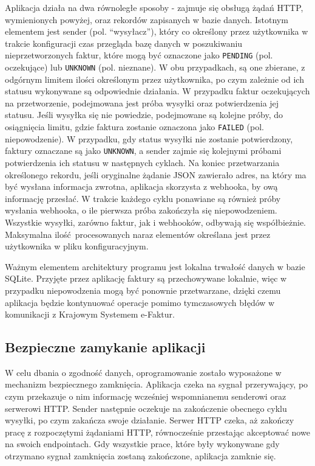 Aplikacja działa na dwa równoległe sposoby - zajmuje się obsługą żądań HTTP, wymienionych powyżej, oraz rekordów zapisanych w bazie danych. Istotnym elementem jest sender (pol. \enquote{wysyłacz}), który co określony przez użytkownika w trakcie konfiguracji czas przegląda bazę danych w poszukiwaniu nieprzetworzonych faktur, które mogą być oznaczone jako \texttt{PENDING} (pol. oczekujące) lub \texttt{UNKNOWN} (pol. nieznane). W obu przypadkach, są one zbierane, z odgórnym limitem ilości określonym przez użytkownika, po czym zależnie od ich statusu wykonywane są odpowiednie działania. W przypadku faktur oczekujących na przetworzenie, podejmowana jest próba wysyłki oraz potwierdzenia jej statusu. Jeśli wysyłka się nie powiedzie, podejmowane są kolejne próby, do osiągnięcia limitu, gdzie faktura zostanie oznaczona jako \texttt{FAILED} (pol. niepowodzenie). W przypadku, gdy status wysyłki nie zostanie potwierdzony, faktury oznaczane są jako \texttt{UNKNOWN}, a sender zajmie się kolejnymi próbami potwierdzenia ich statusu w następnych cyklach. Na koniec przetwarzania określonego rekordu, jeśli oryginalne żądanie JSON zawierało adres, na który ma być wysłana informacja zwrotna, aplikacja skorzysta z webhooka, by ową informację przesłać. W trakcie każdego cyklu ponawiane są również próby wysłania webhooka, o ile pierwsza próba zakończyła się niepowodzeniem. Wszystkie wysyłki, zarówno faktur, jak i webhooków, odbywają się współbieżnie. Maksymalna ilość procesowanych naraz elementów określana jest przez użytkownika w pliku konfiguracyjnym.

Ważnym elementem architektury programu jest lokalna trwałość danych w bazie SQLite. Przyjęte przez aplikację faktury są przechowywane lokalnie, więc w przypadku niepowodzenia mogą być ponownie przetwarzane, dzięki czemu aplikacja będzie kontynuować operacje pomimo tymczasowych błędów w komunikacji z Krajowym Systemem e-Faktur. 

\subsection{Bezpieczne zamykanie aplikacji}
W celu dbania o zgodność danych, oprogramowanie zostało wyposażone w mechanizm bezpiecznego zamknięcia. Aplikacja czeka na sygnał przerywający, po czym przekazuje o nim informację wcześniej wspomnianemu senderowi oraz serwerowi HTTP. Sender następnie oczekuje na zakończenie obecnego cyklu wysyłki, po czym zakańcza swoje działanie. Serwer HTTP czeka, aż zakończy pracę z rozpoczętymi żądaniami HTTP, równocześnie przestając akceptować nowe na swoich endpointach. Gdy wszystkie prace, które były wykonywane gdy otrzymano sygnał zamknięcia zostaną zakończone, aplikacja zamknie się.


